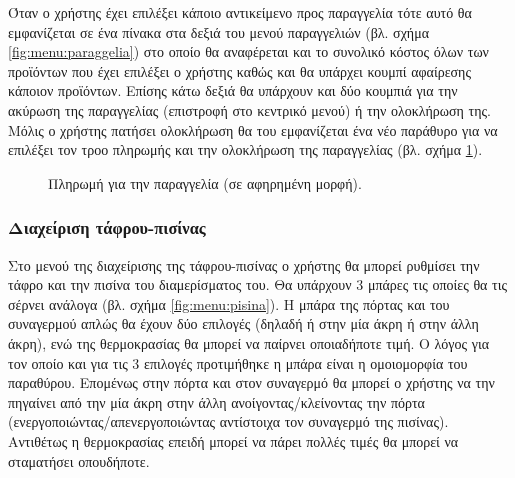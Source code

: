 \documentclass{assignment}
\begin{document}
Όταν ο χρήστης έχει επιλέξει κάποιο αντικείμενο προς παραγγελία τότε αυτό θα εμφανίζεται σε ένα πίνακα στα δεξιά του μενού παραγγελιών (βλ. σχήμα \ref{fig:menu:paraggelia}) στο οποίο θα αναφέρεται και το συνολικό κόστος όλων των προϊόντων που έχει επιλέξει ο χρήστης καθώς και θα υπάρχει κουμπί αφαίρεσης κάποιον προϊόντων. Επίσης κάτω δεξιά θα υπάρχουν και δύο κουμπιά για την ακύρωση της παραγγελίας (επιστροφή στο κεντρικό μενού) ή την ολοκλήρωση της. Μόλις ο χρήστης πατήσει ολοκλήρωση θα του εμφανίζεται ένα νέο παράθυρο για να επιλέξει τον τροο πληρωμής και την ολοκλήρωση της παραγγελίας (βλ. σχήμα \ref{fig:menu:paraggelia_payment}).

\begin{figure}
\begin{center}
\caption{Πληρωμή για την παραγγελία (σε αφηρημένη μορφή).}
\label{fig:menu:paraggelia_payment}
\end{center}
\end{figure}

\subsubsection{Διαχείριση τάφρου-πισίνας}

Στο μενού της διαχείρισης της τάφρου-πισίνας ο χρήστης θα μπορεί ρυθμίσει την τάφρο και την πισίνα του διαμερίσματος του. Θα υπάρχουν 3 μπάρες τις οποίες θα τις σέρνει ανάλογα (βλ. σχήμα \ref{fig:menu:pisina}). Η μπάρα της πόρτας και του συναγερμού απλώς θα έχουν δύο επιλογές (δηλαδή ή στην μία άκρη ή στην άλλη άκρη), ενώ της θερμοκρασίας θα μπορεί να παίρνει οποιαδήποτε τιμή. Ο λόγος για τον οποίο και για τις 3 επιλογές προτιμήθηκε η μπάρα είναι η ομοιομορφία του παραθύρου. Επομένως στην πόρτα και στον συναγερμό θα μπορεί ο χρήστης να την πηγαίνει από την μία άκρη στην άλλη ανοίγοντας/κλείνοντας την πόρτα (ενεργοποιώντας/απενεργοποιώντας αντίστοιχα τον συναγερμό της πισίνας). Αντιθέτως η θερμοκρασίας επειδή μπορεί να πάρει πολλές τιμές θα μπορεί να σταματήσει οπουδήποτε.
\end{document}
